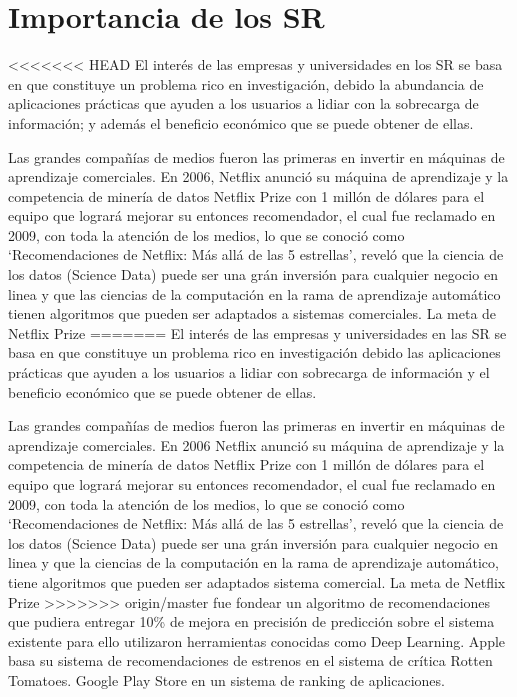 \section{Importancia de los SR}

<<<<<<< HEAD
El interés  de las empresas y universidades en los SR se basa en que constituye un
problema rico en investigación,  debido la abundancia de aplicaciones
prácticas que ayuden a los usuarios a lidiar con la sobrecarga de
información; y además el beneficio económico que se puede obtener de ellas.

Las grandes compañías de medios fueron las primeras en invertir en
máquinas de aprendizaje comerciales. En 2006, Netflix anunció su máquina
de aprendizaje y la competencia de minería de datos Netflix Prize con 1 millón de
dólares para el equipo que logrará mejorar su entonces recomendador, el cual fue reclamado en 2009, con toda la atención de
los medios, lo que se conoció como `Recomendaciones de Netflix: Más allá
de las 5 estrellas', reveló  que la ciencia de los datos (Science Data) puede ser una grán inversión para cualquier negocio en linea y que las ciencias de la computación en la rama de aprendizaje automático tienen algoritmos que pueden ser adaptados a sistemas comerciales. La meta de Netflix Prize
=======
El interés  de las empresas y universidades en las SR se basa en que  constituye un
problema rico en investigación  debido las  aplicaciones
prácticas que ayuden a los usuarios a lidiar con sobrecarga de
información y el beneficio económico que se puede obtener de ellas.

Las grandes compañías de medios fueron las primeras en invertir en
máquinas de aprendizaje comerciales. En 2006 Netflix anunció su máquina
de aprendizaje y la competencia de minería de datos Netflix Prize con 1 millón de
dólares para el equipo que logrará mejorar su entonces recomendador, el cual fue reclamado en 2009, con toda la atención de
los medios, lo que se conoció como `Recomendaciones de Netflix: Más allá
de las 5 estrellas', reveló  que la ciencia de los datos (Science Data) puede ser una grán inversión para cualquier negocio en linea y que la ciencias de la computación en la rama de aprendizaje automático, tiene algoritmos que pueden ser adaptados sistema comercial. La meta de Netflix Prize
>>>>>>> origin/master
fue fondear un algoritmo de recomendaciones que pudiera entregar 10\% de
mejora en precisión de predicción sobre el sistema existente para ello utilizaron herramientas conocidas como Deep Learning. Apple basa
su sistema de recomendaciones de estrenos en el sistema de crítica
Rotten Tomatoes. Google Play Store en un sistema de ranking de
aplicaciones.

